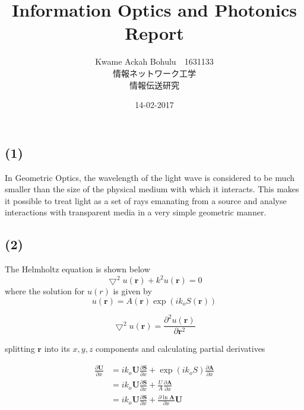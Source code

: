 \documentclass[24 pts]{article}
\title{Information Optics and Photonics	Report }
\date{14-02-2017}
\author{Kwame Ackah Bohulu　1631133 \\ 情報ネットワーク工学 \\情報伝送研究}
\begin{document}
\maketitle
\newpage
\section{}
\subsection{(1)}
In Geometric Optics, the wavelength of the light wave is considered to be much smaller than the size of the physical medium with which it interacts. This makes it possible to treat light as a set of rays emanating from a source and analyse interactions with transparent media in a very simple geometric manner. 

\subsection{(2)}
The Helmholtz equation is shown below
\begin{equation}
\bigtriangledown^2u(\mathbf{r}) + k^2u(\mathbf{r})=0
\end{equation}
where the solution for $u(r)$ is given by
$$ u(\mathbf{r})=A(\mathbf{r})\exp(ik_oS(\mathbf{r}))$$

$$\bigtriangledown^2u(\mathbf{r}) =\frac{\partial ^2u(\mathbf{r}) }{\partial \mathbf{r}^2}$$

splitting $\mathbf{r}$ into its $x,y,z$ components and calculating partial derivatives

\begin{equation*}
\begin{split}
\frac{\partial \mathbf{U} }{\partial x}&=ik_o\mathbf{U}\frac{\partial \mathbf{S} }{\partial x} + \exp(ik_oS)\frac{\partial \mathbf{A}}{\partial x}\\
&=ik_o\mathbf{U}\frac{\partial \mathbf{S} }{\partial x} +\frac{U}{A}\frac{\partial \mathbf{A}}{\partial x}\\
&=ik_o\mathbf{U}\frac{\partial \mathbf{S} }{\partial x} +\frac{\partial \ln \mathbf{A}}{\partial x}\mathbf{U}
\end{split}
\end{equation*}
\end{document}
